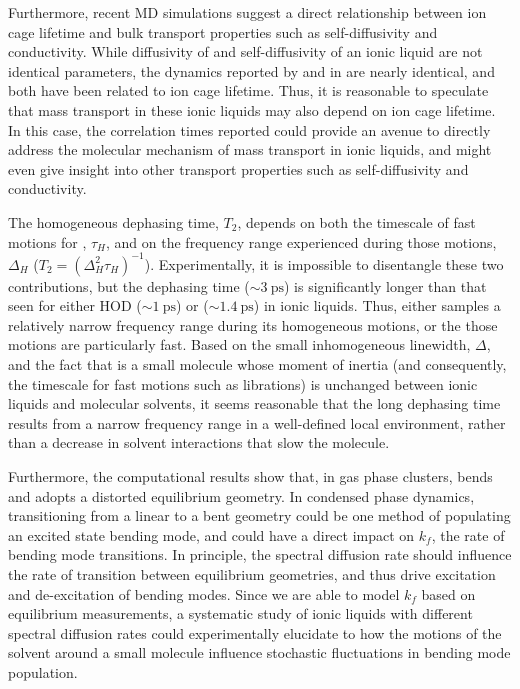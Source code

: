 \documentclass[%
  class = book,%
  crop = false,%
  float = true,%
  multi = true,%
  preview = false,%
]{standalone}
\begin{document}
{Furthermore, recent MD simulations suggest a direct relationship between ion cage lifetime and bulk transport properties such as self-diffusivity and conductivity.\cite{Zhang2015b} While diffusivity of  and self-diffusivity of an ionic liquid are not identical parameters, the dynamics reported by  and \ce{[SCN]-}\cite{Ren2014} in \ce{[Im_{4,1}][Tf2N]} are nearly identical, and both have been related to ion cage lifetime. Thus, it is reasonable to speculate that  mass transport in these ionic liquids may also depend on ion cage lifetime. In this case, the correlation times reported could provide an avenue to directly address the molecular mechanism of  mass transport in ionic liquids, and might even give insight into other transport properties such as self-diffusivity and conductivity.

The homogeneous dephasing time, \(T_2\), depends on both the timescale of fast motions for , \(\tau_H\), and on the frequency range experienced during those motions, \(\Delta_H\) (\(T_{2} = \left( {\Delta}_H^{2}\tau_H \right)^{-1}\)). Experimentally, it is impossible to disentangle these two contributions, but the dephasing time (\(\sim \SI{3}{\ps}\)) is significantly longer than that seen for either HOD (\(\sim \SI{1}{\ps}\)) or  (\(\sim \SI{1.4}{\ps}\)) in ionic liquids. Thus, either  samples a relatively narrow frequency range during its homogeneous motions, or the those motions are particularly fast. Based on the small inhomogeneous linewidth, \(\Delta\), and the fact that  is a small molecule whose moment of inertia (and consequently, the timescale for fast motions such as librations) is unchanged between ionic liquids and molecular solvents, it seems reasonable that the long dephasing time results from a narrow frequency range in a well-defined local environment, rather than a decrease in solvent interactions that slow the molecule.

Furthermore, the computational results show that, in gas phase clusters,  bends and adopts a distorted equilibrium geometry. In condensed phase dynamics, transitioning from a linear to a bent geometry could be one method of populating an excited state bending mode, and could have a direct impact on \(k_f\), the rate of bending mode transitions. In principle, the spectral diffusion rate should influence the rate of transition between equilibrium geometries, and thus drive excitation and de-excitation of bending modes. Since we are able to model \(k_f\) based on equilibrium measurements, a systematic study of ionic liquids with different spectral diffusion rates could experimentally elucidate to how the motions of the solvent around a small molecule influence stochastic fluctuations in bending mode population.

}
\end{document}
